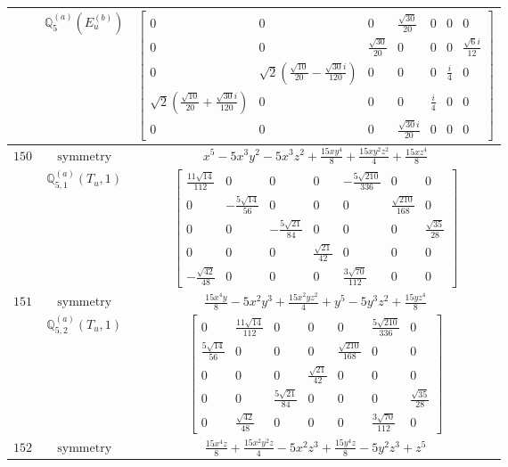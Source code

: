 \documentclass[fleqn,8pt,landscape]{jsarticle}
\begin{document}
\begin{longtable}{ccc}
$  $ & $ \mathbb{Q}_{5}^{(a)}(E_{u}^{(b)}) $ & $ \begin{bmatrix} 0 & 0 & 0 & \frac{\sqrt{30}}{20} & 0 & 0 & 0 \\ 0 & 0 & \frac{\sqrt{30}}{20} & 0 & 0 & 0 & \frac{\sqrt{6} i}{12} \\ 0 & \sqrt{2} \left(\frac{\sqrt{10}}{20} - \frac{\sqrt{30} i}{120}\right) & 0 & 0 & 0 & \frac{i}{4} & 0 \\ \sqrt{2} \left(\frac{\sqrt{10}}{20} + \frac{\sqrt{30} i}{120}\right) & 0 & 0 & 0 & \frac{i}{4} & 0 & 0 \\ 0 & 0 & 0 & \frac{\sqrt{30} i}{20} & 0 & 0 & 0 \end{bmatrix} $ \\ \hline
$ 150 $ & $ \text{symmetry} $ & $ x^{5} - 5 x^{3} y^{2} - 5 x^{3} z^{2} + \frac{15 x y^{4}}{8} + \frac{15 x y^{2} z^{2}}{4} + \frac{15 x z^{4}}{8} $ \\
$  $ & $ \mathbb{Q}_{5,1}^{(a)}(T_{u},1) $ & $ \begin{bmatrix} \frac{11 \sqrt{14}}{112} & 0 & 0 & 0 & - \frac{5 \sqrt{210}}{336} & 0 & 0 \\ 0 & - \frac{5 \sqrt{14}}{56} & 0 & 0 & 0 & \frac{\sqrt{210}}{168} & 0 \\ 0 & 0 & - \frac{5 \sqrt{21}}{84} & 0 & 0 & 0 & \frac{\sqrt{35}}{28} \\ 0 & 0 & 0 & \frac{\sqrt{21}}{42} & 0 & 0 & 0 \\ - \frac{\sqrt{42}}{48} & 0 & 0 & 0 & \frac{3 \sqrt{70}}{112} & 0 & 0 \end{bmatrix} $ \\ \hline
$ 151 $ & $ \text{symmetry} $ & $ \frac{15 x^{4} y}{8} - 5 x^{2} y^{3} + \frac{15 x^{2} y z^{2}}{4} + y^{5} - 5 y^{3} z^{2} + \frac{15 y z^{4}}{8} $ \\
$  $ & $ \mathbb{Q}_{5,2}^{(a)}(T_{u},1) $ & $ \begin{bmatrix} 0 & \frac{11 \sqrt{14}}{112} & 0 & 0 & 0 & \frac{5 \sqrt{210}}{336} & 0 \\ \frac{5 \sqrt{14}}{56} & 0 & 0 & 0 & \frac{\sqrt{210}}{168} & 0 & 0 \\ 0 & 0 & 0 & \frac{\sqrt{21}}{42} & 0 & 0 & 0 \\ 0 & 0 & \frac{5 \sqrt{21}}{84} & 0 & 0 & 0 & \frac{\sqrt{35}}{28} \\ 0 & \frac{\sqrt{42}}{48} & 0 & 0 & 0 & \frac{3 \sqrt{70}}{112} & 0 \end{bmatrix} $ \\ \hline
$ 152 $ & $ \text{symmetry} $ & $ \frac{15 x^{4} z}{8} + \frac{15 x^{2} y^{2} z}{4} - 5 x^{2} z^{3} + \frac{15 y^{4} z}{8} - 5 y^{2} z^{3} + z^{5} $ \\

\end{longtable}
\end{document}
